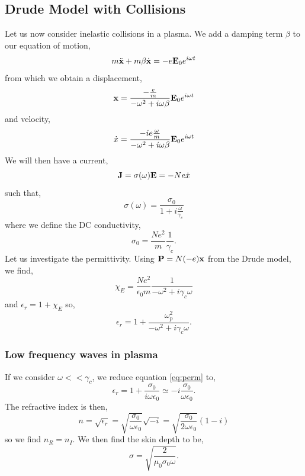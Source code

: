 \documentclass{book}
\begin{document}
\subsection{Drude Model with Collisions}
Let us now consider inelastic collisions in a plasma. We add a damping term $\beta$ to our equation of motion,
\begin{equation}
	m\Ddot{\vb{x}} + m\beta\Dot{\vb{x}} = -e\vb{E}_0e^{i\omega t}
\end{equation}
from which we obtain a displacement,
\begin{equation}
	\vb{x} = \frac{-\frac{e}{m}}{-\omega^2 + i\omega\beta}\vb{E}_0e^{i\omega t}
\end{equation}
and velocity,
\begin{equation}
	\Dot{x} = \frac{-ie\frac{\omega}{m}}{-\omega^2 + i\omega\beta}\vb{E}_0e^{i\omega t}
\end{equation}
We will then have a current,
\begin{equation}
	\vb{J} = \sigma(\omega)\vb{E} = -Ne\Dot{x}
\end{equation}
such that,
\begin{equation}
	\sigma(\omega) = \frac{\sigma_0}{1 + i\frac{\omega}{\gamma_c}}
\end{equation}
where we define the DC conductivity,
\begin{equation}
	\sigma_0 = \frac{Ne^2}{m}\frac{1}{\gamma_c}.
\end{equation}
Let us investigate the permittivity. Using $\vb{P}  = N(-e)\vb{x}$ from the Drude model, we find,
\begin{equation}
	\chi_E = \frac{Ne^2}{\epsilon_0m}\frac{1}{-\omega^2 + i\gamma_c\omega}
\end{equation}
and $\epsilon_r = 1 + \chi_E$ so,
\begin{equation}
	\epsilon_r = 1+ \frac{\omega_p^2}{-\omega^2 + i\gamma_c\omega}. \label{eq:perm}
\end{equation}
\subsubsection{Low frequency waves in plasma}
If we consider $\omega << \gamma_c$, we reduce equation \eqref{eq:perm} to,
\begin{equation}
	\epsilon_r = 1+ \frac{\sigma_0}{i\omega\epsilon_0} \simeq -i\frac{\sigma_0}{\omega\epsilon_0}.
\end{equation}
The refractive index is then,
\begin{equation}
	n = \sqrt{\epsilon_r} = \sqrt{\frac{\sigma_0}{\omega\epsilon_0}}\sqrt{-i} = \sqrt{\frac{\sigma_0}{2\omega\epsilon_0}}(1-i)
\end{equation}
so we find $n_R = n_I$. We then find the skin depth to be,
\begin{equation}
	\sigma = \sqrt{\frac{2}{\mu_0\sigma_0\omega}}.
\end{equation}
\end{document}
